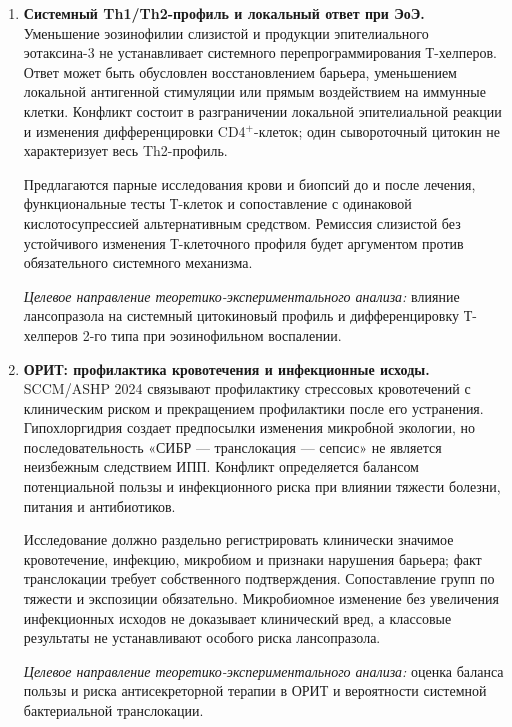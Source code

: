 \documentclass[11pt,a4paper,notitlepage]{report}
\newcommand{\src}[1]{\unskip\space\cite{#1}}
\begin{document}
\begin{enumerate}[label=\textbf{\arabic*.},start=12,leftmargin=*,itemsep=0.9\baselineskip]
Следует раздельно оценить вклад почечной функции, дозы метотрексата, локальной экспозиции и альтернативных транспортных путей. Везикулярные опыты должны сопоставляться с клинической фармакокинетикой. Сохранение взаимодействия при отсутствии достаточного ингибирования ABCG2 потребует пересмотра единственного транспортного объяснения, а не отрицания клинического риска.

\textit{Целевое направление теоретико-экспериментального анализа:} фармакокинетическое взаимодействие лансопразола с метотрексатом на уровне АТФ-связывающих транспортеров.

\item \textbf{Системный Th1/Th2-профиль и локальный ответ при ЭоЭ.} Уменьшение эозинофилии слизистой и продукции эпителиального эотаксина-3 не устанавливает системного перепрограммирования Т-хелперов. Ответ может быть обусловлен восстановлением барьера, уменьшением локальной антигенной стимуляции или прямым воздействием на иммунные клетки. Конфликт состоит в разграничении локальной эпителиальной реакции и изменения дифференцировки CD4$^+$-клеток; один сывороточный цитокин не характеризует весь Th2-профиль.\src{eoestat6,eoe,molnrf2}

Предлагаются парные исследования крови и биопсий до и после лечения, функциональные тесты Т-клеток и сопоставление с одинаковой кислотосупрессией альтернативным средством. Ремиссия слизистой без устойчивого изменения Т-клеточного профиля будет аргументом против обязательного системного механизма.

\textit{Целевое направление теоретико-экспериментального анализа:} влияние лансопразола на системный цитокиновый профиль и дифференцировку Т-хелперов 2-го типа при эозинофильном воспалении.

\item \textbf{ОРИТ: профилактика кровотечения и инфекционные исходы.} SCCM/ASHP 2024 связывают профилактику стрессовых кровотечений с клиническим риском и прекращением профилактики после его устранения. Гипохлоргидрия создает предпосылки изменения микробной экологии, но последовательность «СИБР --- транслокация --- сепсис» не является неизбежным следствием ИПП. Конфликт определяется балансом потенциальной пользы и инфекционного риска при влиянии тяжести болезни, питания и антибиотиков.\src{sccm,safemicrotrial}

Исследование должно раздельно регистрировать клинически значимое кровотечение, инфекцию, микробиом и признаки нарушения барьера; факт транслокации требует собственного подтверждения. Сопоставление групп по тяжести и экспозиции обязательно. Микробиомное изменение без увеличения инфекционных исходов не доказывает клинический вред, а классовые результаты не устанавливают особого риска лансопразола.

\textit{Целевое направление теоретико-экспериментального анализа:} оценка баланса пользы и риска антисекреторной терапии в ОРИТ и вероятности системной бактериальной транслокации.

\end{enumerate}
\end{document}
